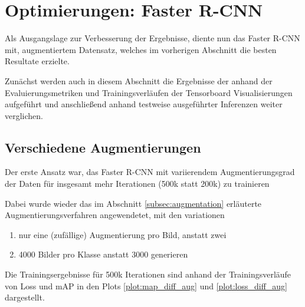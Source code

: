 \section{Optimierungen: Faster R-CNN}\label{sec:optimierung_faster_rcnn}

Als Ausgangslage zur Verbesserung der Ergebnisse, diente 
nun das Faster R-CNN mit, augmentiertem Datensatz, welches 
im vorherigen Abschnitt die besten Resultate erzielte.

Zunächst werden auch in diesem Abschnitt die Ergebnisse der 
anhand der Evaluierungsmetriken und Trainingsverläufen 
der Tensorboard Visualisierungen aufgeführt und anschließend
anhand testweise ausgeführter Inferenzen weiter verglichen.




\subsection{Verschiedene Augmentierungen}

Der erste Ansatz war, das Faster R-CNN mit 
variierendem Augmentierungsgrad der Daten für insgesamt
mehr Iterationen (500k statt 200k) zu trainieren 

Dabei wurde wieder das im Abschnitt \ref{subsec:augmentation} 
erläuterte Augmentierungsverfahren angewendetet, mit den variationen
\begin{enumerate}
  \item nur eine (zufällige) Augmentierung pro Bild, anstatt zwei
  \item 4000 Bilder pro Klasse anstatt 3000 generieren
\end{enumerate}

Die Trainingsergebnisse für 500k Iterationen sind anhand der 
Trainingsverläufe von Loss und mAP in den Plots
\ref{plot:map_diff_aug} und \ref{plot:loss_diff_aug} dargestellt.

\vspace{1cm}

\begin{minipage}{0.5\textwidth}
  \centering
  \def\svgwidth{0.9\textwidth}
  
  \label{plot:map_diff_aug}
\end{minipage}
\begin{minipage}{0.5\textwidth}
  \centering
  \def\svgwidth{0.9\textwidth}
  
  \label{plot:loss_diff_aug}
\end{minipage}

